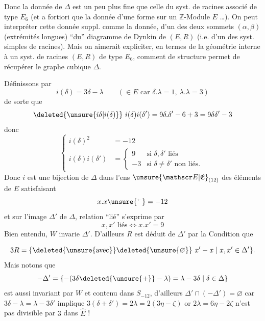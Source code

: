 Donc la donnée de $\Delta$ est un peu plus fine que celle du syst. de racines associé de type $E_6$ (et a fortiori que la donnée d'une forme   sur un $\mathbb Z$-Module $E$ \ldots). On peut interpréter cette donnée suppl. comme la donnée,  d'un des deux sommets
\diagram{\begin{tikzcd}[ampersand replacement=\&,column sep=small,row sep=tiny]
\alpha\,\bullet\arrow[r,dash]\&\bullet\arrow[r,dash]\&\bullet\arrow[r,dash]\arrow[d,dash]\&\bullet\arrow[r,dash]\&\bullet\,\beta\\
\&\&\bullet
\end{tikzcd}}
$(\alpha,\beta)$ (extrémités longues) ``\uline{du}'' diagramme de Dynkin de $(E,R)$ (i.e. d'un des syst. simples de racines). Mais on aimerait expliciter, en termes de la géométrie interne à  un syst. de racines $(E,R)$ de type $E_6$, comment   de structure permet de récupérer le graphe cubique $\Delta$.

Définissons
par
\[
i(\delta)=3\delta-\lambda\qquad(\in E\text{ car }\delta.\lambda=1,\ \lambda.\lambda=3)
\]
de sorte que 
\[
\deleted{\unsure{i\delta|i(\delta)}}\ i(\delta)i(\delta')=9\delta.\delta'-6+3=9\delta\delta'-3
\]
donc
\[
\left\{\begin{aligned}
i(\delta)^2&=-12\\
i(\delta)i(\delta')&=\begin{cases}9&\text{si }\delta,\delta'\text{ liés}\\-3&\text{si }\delta\ne\delta'\text{ non liés}.\end{cases}
\end{aligned}\right.
\]
Donc $i$ est une bijection de $\Delta$ dans  l'ens $\unsure{\mathscr E|\mathfrak E}_{(12)}$ des éléments  de $E$ satisfaisant
\[
x.x\unsure{{}^{\scriptscriptstyle\leftarrow}}=-12
\]
et sur l'image $\Delta'$ de $\Delta$,  relation ``lié'' s'exprime par
\[
x,x'\text{ liés}\Longleftrightarrow x.x'=9
\]
Bien entendu, $W$ invarie $\Delta'$.  D'ailleurs $R$ est déduit de $\Delta'$  par la Condition que 

\[
3R=\{\deleted{\unsure{\text{avec}}}\deleted{\unsure{\varnothing}}\ x'-x\mid x,x'\in\Delta'\}.
\]
Mais  notons que
\[
-\Delta'=\{-(3\delta\deleted{\unsure{+}}-\lambda)=\lambda-3\delta\mid\delta\in\Delta\}
\]
est aussi invariant par $W$ et contenu dans $S_{-12}$, d'ailleurs  $\Delta'\cap(-\Delta')=\varnothing$ car $3\delta-\lambda=\lambda-3\delta'$ implique $3(\delta+\delta')=2\lambda=2(3\eta-\zeta)$ or $2\lambda=6\eta-2\zeta$ n'est pas divisible par $3$ dans $\widehat E$ !

